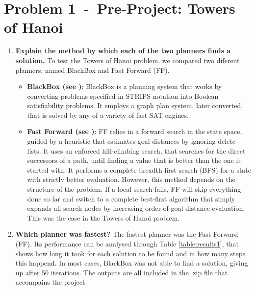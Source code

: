 \documentclass[12pt]{article}
\newcommand{\problem}[2]{\section*{Problem {#1}~-~{#2}}}
\begin{document}
\problem{1}{Pre-Project: Towers of Hanoi}
\label{sec:problem_1}
\begin{enumerate}
 \item  \textbf{Explain the method by which each of the two planners ﬁnds a solution.} \newline
To test the Towers of Hanoi problem, we compared two diferent planners, named BlackBox and Fast Forward (FF).
 \begin{itemize}
      \item \textbf{BlackBox (see \cite{Blackbox})}: BlackBox is a planning system that works by converting problems specified in STRIPS notation into Boolean satisfiability problems. It employs a graph plan system, later converted, that is solved by any of a variety of fast SAT engines.
      \item \textbf{Fast Forward (see \cite{FastForward})}: FF relies in a forward search in the state space, guided by a heuristic that estimates goal distances by ignoring delete lists. It uses an enforced hill-climbing search, that searches for the direct successors of a path, until finding a value that is better than the one it started with. It performs a complete breadth first search (BFS) for a state with strictly better evaluation. However, this method depends on the structure of the problem. If a local search fails, FF will skip everything done so far and switch to a complete best-first algorithm that simply expands all search nodes by increasing order of goal distance evaluation. This was the case in the Towers of Hanoi problem.
 \end{itemize}
 \item  \textbf{Which planner was fastest?} \newline
The fastest planner was the Fast Forward (FF). Its performance can be analysed through Table \ref{table:results1}, that shows how long it took for each solution to be found and in how many steps this happend. In most cases, BlackBox was not able to find a solution, giving up after 50 iterations. The outputs are all included in the .zip file that accompains the project.


\end{enumerate}
\end{document}
